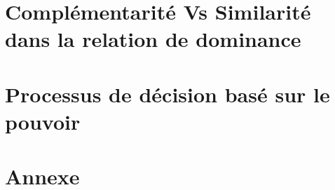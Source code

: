 \documentclass[a4paper, 11pt]{book}
\begin{document}
	
%	
%	
	
%	
%	

\chapter{Complémentarité Vs Similarité dans la relation de dominance}

	\minitoc
	
	\chapter{Processus de décision basé sur le pouvoir}
			
	\chapter{Annexe}
%
		
			\label{chap:Annexe}

	
	
\end{document}
